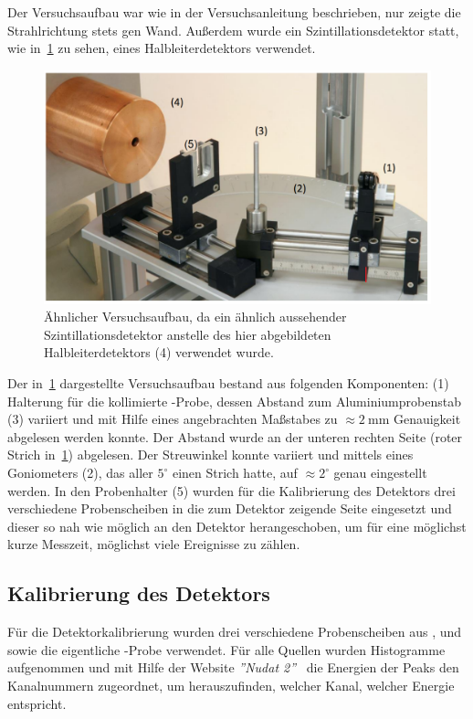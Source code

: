\documentclass[slug=CS, room=Andreas-Schubert-Bau\,\ Labor\ 406,
supervisor=Juliane\ Volkmer, coursedate=29.\ 11.\ 2019]{../../Lab_Report_LaTeX/lab_report}
\newcommand{\am}{\ce{^241Am} }
\begin{document}
Der Versuchsaufbau war wie in der Versuchsanleitung beschrieben, nur zeigte die Strahlrichtung
stets gen Wand. Außerdem wurde ein Szintillationsdetektor statt, wie in~\ref{fig:versuchsaufbau}
zu sehen, eines Halbleiterdetektors verwendet.

\begin{figure}[H]\centering
        \includegraphics[width=.7\columnwidth]{./pictures/versuchsaufbau.png}
        \caption{Ähnlicher Versuchsaufbau, da ein ähnlich aussehender Szintillationsdetektor anstelle
                des hier abgebildeten Halbleiterdetektors (4) verwendet wurde.}
        \label{fig:versuchsaufbau}
\end{figure}

Der in~\ref{fig:versuchsaufbau} dargestellte Versuchsaufbau bestand aus folgenden Komponenten:
(1) Halterung für die kollimierte \am{}-Probe, dessen Abstand zum Aluminiumprobenstab (3)
variiert und mit Hilfe eines angebrachten Maßstabes zu \(\approx \SI{2}{\milli\metre}\)
Genauigkeit abgelesen werden konnte. Der Abstand wurde an der unteren rechten Seite (roter Strich
in~\ref{fig:versuchsaufbau}) abgelesen. Der Streuwinkel konnte variiert und mittels eines
Goniometers (2), das aller \(5^\circ\) einen Strich hatte, auf \(\approx 2^\circ\) genau
eingestellt werden. In den Probenhalter (5) wurden für die Kalibrierung des Detektors drei
verschiedene Probenscheiben in die zum Detektor zeigende Seite eingesetzt und dieser so nah wie
möglich an den Detektor herangeschoben, um für eine möglichst kurze Messzeit, möglichst viele Ereignisse zu zählen.

\subsection{Kalibrierung des Detektors}
\label{sec:kalib}

Für die Detektorkalibrierung wurden drei verschiedene Probenscheiben aus ,
 und  sowie die eigentliche \am{}-Probe verwendet.
Für alle Quellen wurden Histogramme aufgenommen und mit Hilfe der Website \emph{''Nudat 2''}~\cite{nudat}
die Energien der Peaks den Kanalnummern zugeordnet, um herauszufinden, welcher Kanal, welcher
Energie entspricht.
\end{document}

